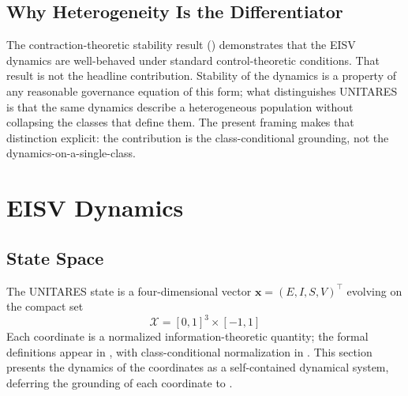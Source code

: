 \documentclass[11pt,twocolumn]{article}
\newcommand{\eisv}{\ensuremath{\mathbf{x}}}
\begin{document}
\subsection{Why Heterogeneity Is the Differentiator}

The contraction-theoretic stability result
() demonstrates that the EISV dynamics
are well-behaved under standard control-theoretic conditions. That
result is not the headline contribution. Stability of the dynamics
is a property of any reasonable governance equation of this form;
what distinguishes UNITARES is that the same dynamics describe a
heterogeneous population without collapsing the classes that define
them. The present framing makes that distinction explicit: the
contribution is the class-conditional grounding, not the
dynamics-on-a-single-class.

\section{EISV Dynamics}
\label{sec:dynamics}

\subsection{State Space}

The UNITARES state is a four-dimensional vector
$\eisv = (E, I, S, V)^\top$ evolving on the compact set
\[
  \mathcal{X} = [0,1]^3 \times [-1, 1]
\]
Each coordinate is a normalized information-theoretic quantity;
the formal definitions appear in , with
class-conditional normalization in .
This section presents the dynamics of the coordinates as a
self-contained dynamical system, deferring the grounding of each
coordinate to .
\end{document}
